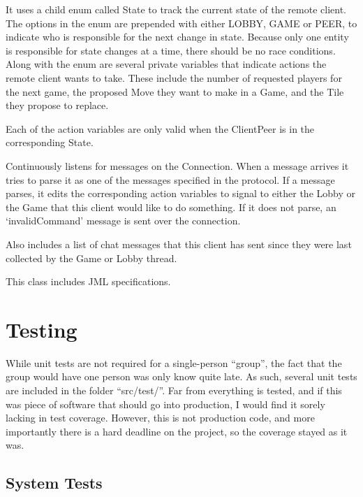 \documentclass[12pt, letterpaper]{article}
\begin{document}
    It uses a child enum called State to track the current state of the remote client.
    The options in the enum are prepended with either LOBBY, GAME or PEER, to indicate who is responsible for the
    next change in state.
    Because only one entity is responsible for state changes at a time, there should be no race conditions.
    Along with the enum are several private variables that indicate actions the remote client wants to take.
    These include the number of requested players for the next game, the proposed Move they want to make in a Game,
    and the Tile they propose to replace.

    Each of the action variables are only valid when the ClientPeer is in the corresponding State.

    Continuously listens for messages on the Connection.
    When a message arrives it tries to parse it as one of the messages specified in the protocol.
    If a message parses, it edits the corresponding action variables to signal to either the Lobby or the Game that
    this client would like to do something.
    If it does not parse, an `invalidCommand' message is sent over the connection.

    Also includes a list of chat messages that this client has sent since they were last collected by the Game or Lobby
    thread.

    This class includes JML specifications.


    \section{Testing}
    \label{sec:testing}

    While unit tests are not required for a single-person ``group'', the fact that the group would have one person was
    only know quite late.
    As such, several unit tests are included in the folder ``src/test/''.
    Far from everything is tested, and if this was piece of software that should go into production, I would find it
    sorely lacking in test coverage.
    However, this is not production code,
    and more importantly there is a hard deadline on the project, so the coverage stayed as it was.


    \subsection{System Tests}
\end{document}
